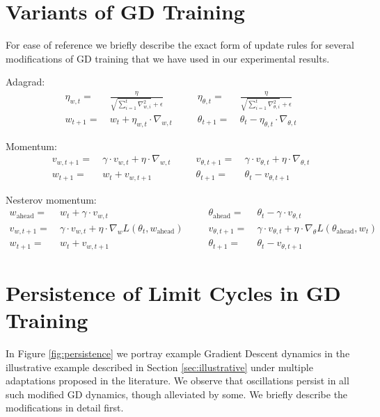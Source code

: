 \section{Variants of GD Training}\label{sec:GD-variants}

For ease of reference we briefly describe the exact form of update rules for several modifications of GD training that we have used in our experimental results. 

Adagrad: 
\begin{equation}\label{eqn:GDadaptive}
\begin{aligned}
\eta_{w,t} = ~&\frac{\eta}{\sqrt{\sum_{i=1}^t \nabla_{w,i}^2} + \epsilon} ~~~~&~~~~ 
\eta_{\theta,t} = ~&\frac{\eta}{\sqrt{\sum_{i=1}^t \nabla_{\theta,i}^2} + \epsilon} \\
w_{t+1} =~& w_t + \eta_{w,t} \cdot \nabla_{w,t}
~~~~&~~~~
\theta_{t+1} =~& \theta_{t} - \eta_{\theta,t} \cdot \nabla_{\theta,t}
\end{aligned}
\end{equation}

Momentum:
\begin{equation}\label{eqn:GDMomentum}
\begin{aligned}
v_{w, t+1} =~& \gamma \cdot v_{w, t} + \eta \cdot \nabla_{w,t} 
~~~~&~~~~
v_{\theta, t+1} =~& \gamma \cdot v_{\theta, t} + \eta \cdot \nabla_{\theta,t} \\
w_{t+1} =~& w_t + v_{w, t+1}
~~~~&~~~~
\theta_{t+1} =~& \theta_t - v_{\theta, t+1}
\end{aligned}
\end{equation}

Nesterov momentum:
\begin{equation}\label{eqn:GDNesterov}
\begin{aligned}
w_{\text{ahead}} =~& w_t + \gamma \cdot v_{w,t} 
~~~~&~~~~
\theta_{\text{ahead}} =~& \theta_t - \gamma \cdot v_{\theta,t} \\
v_{w, t+1} =~& \gamma \cdot v_{w, t} + \eta \cdot \nabla_{w} L(\theta_t, w_{\text{ahead}}) 
~~~~&~~~~
v_{\theta,t+1} =~& \gamma \cdot  v_{\theta,t} + \eta \cdot \nabla_{\theta} L(\theta_{\text{ahead}}, w_t) \\
w_{t+1} =~& w_t + v_{w, t+1}
~~~~&~~~~
\theta_{t+1} =~& \theta_t - v_{\theta,t+1}
\end{aligned}
\end{equation}


\section{Persistence of Limit Cycles in GD Training}
In Figure \ref{fig:persistence} we portray example Gradient Descent dynamics in the illustrative example described in Section \ref{sec:illustrative} under multiple adaptations proposed in the literature. We observe that oscillations persist in all such modified GD dynamics, though alleviated by some. We briefly describe the modifications in detail first.

